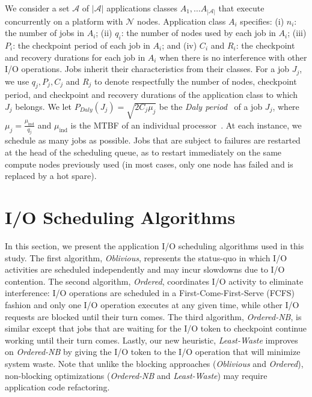 \documentclass[conference,nofonttune]{IEEEtran}
\newcommand{\muind}{\mu_{\text{ind}}}
\newcommand{\appset}{{\mathcal A}}
\newcommand{\nbnodesplat}{{\mathcal N}}
\newcommand{\nbapps}{|{\mathcal A}|}
\newcommand{\app}[1]{A_{#1}}
\newcommand{\nbapp}[1]{n_{#1}}
\newcommand{\nbnodes}[1]{q_{#1}}
\newcommand{\period}[1]{P_{#1}}
\newcommand{\ckpt}[1]{C_{#1}}
\newcommand{\reco}[1]{R_{#1}}
\newcommand{\nocoop}{\emph{Oblivious}\xspace}
\newcommand{\fifoblock}{\emph{Ordered}\xspace}
\newcommand{\fifononblock}{\emph{Ordered-NB}\xspace}
\newcommand{\leastwaste}{\emph{Least-Waste}\xspace}
\def\cooperative{\leastwaste}
\begin{document}
We consider a set $\appset$ of $\nbapps$ applications classes
$\app{1}, \ldots \app{\nbapps}$ that execute concurrently on a platform with
$\nbnodesplat$ nodes. Application class $\app{i}$ specifies: (i) $\nbapp{i}$: the number of jobs in $\app{i}$;
(ii) $\nbnodes{i}$: the number of nodes used by each job in $\app{i}$;
(iii) $\period{i}$: the checkpoint period of each job in $\app{i}$; and
(iv) $\ckpt{i}$ and $\reco{i}$: the checkpoint and recovery durations for each job in $\app{i}$ when there is no interference with other I/O operations.
Jobs inherit their characteristics from their classes.
For a job $J_j$, we use $\nbnodes{j}, \period{j}, \ckpt{j}$ and
$\reco{j}$ to denote respectfully the number of nodes, checkpoint
period, and checkpoint and recovery durations of the application class
to which $J_j$ belongs.  We let
$\period{Daly}(J_{j}) = \sqrt{2 \ckpt{j} \mu_{j}}$ be the \emph{Daly
  period}~\cite{young74,daly04} of a job $J_j$, where
$\mu_{j} = \frac{\muind}{\nbnodes{j}}$ and $\muind$ is the MTBF of an
individual processor~\cite{springer-monograph}.  At each instance, we
schedule as many jobs as possible.  Jobs that are subject to failures
are restarted at the head of the scheduling queue, as to restart
immediately on the same compute nodes previously used (in most cases,
only one node has failed and is replaced by a hot spare).



%

\section{I/O Scheduling Algorithms}
\label{sec:algorithms}

In this section, we present the application I/O scheduling algorithms used in
this study.  The first algorithm, \nocoop, represents the status-quo in which
I/O activities are scheduled independently and may incur slowdowns due to I/O
contention. The second algorithm, \fifoblock, coordinates I/O activity to
eliminate interference: I/O operations are scheduled in a
First-Come-First-Serve (FCFS) fashion and only one I/O operation executes at
any given time, while other I/O requests are blocked until their turn comes.
The third algorithm, \fifononblock, is similar except that jobs that are
waiting for the I/O token to checkpoint continue working until their turn
comes.  Lastly, our new heuristic, \leastwaste improves on
\fifononblock by giving the I/O token to the I/O operation that will minimize
system waste. Note that unlike the blocking approaches (\nocoop and
\fifoblock), non-blocking optimizations (\fifononblock and \cooperative) may
require application code refactoring.
\end{document}
